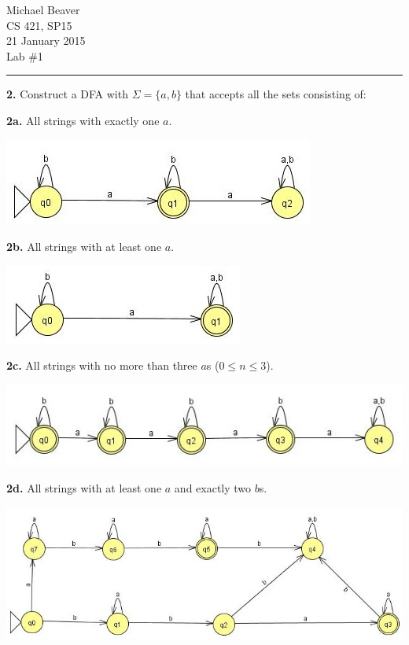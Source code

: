 \documentclass[12pt,letter]{article}
\begin{document}
Michael Beaver\\
CS 421, SP15\\
21 January 2015\\
Lab \#1
\hrule

\textbf{2.} Construct a DFA with $\Sigma = \lbrace a,b \rbrace$ that accepts all the sets consisting of:

\textbf{2a.} All strings with exactly one $a$.\\
\begin{center}
	\includegraphics{"images/Lab 1 - 2a"}
\end{center}

\textbf{2b.} All strings with at least one $a$.\\
\begin{center}
	\includegraphics{"images/Lab 1 - 2b"}
\end{center}

\textbf{2c.} All strings with no more than three $a$s ($0 \leq n \leq 3$).\\
\begin{center}
	\includegraphics{"images/Lab 1 - 2c"}
\end{center}

\textbf{2d.} All strings with at least one $a$ and exactly two $b$s.\\
\begin{center}
	\includegraphics[scale=0.75]{"images/Lab 1 - 2d"}
\end{center}
\end{document}
